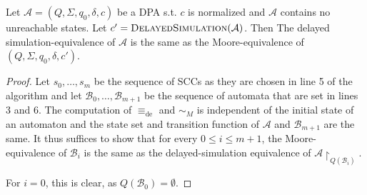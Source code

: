 \begin{theorem}
	Let $\mathcal{A} = (Q, \Sigma, q_0, \delta, c)$ be a DPA s.t. $c$ is normalized and $\mathcal{A}$ contains no unreachable states. Let $c' = \textsc{DelayedSimulation}(\mathcal{A})$. Then The delayed simulation-equivalence of $\mathcal{A}$ is the same as the Moore-equivalence of $(Q, \Sigma, q_0, \delta, c')$.
\end{theorem}

\begin{proof}
	Let $s_0, \dots, s_m$ be the sequence of SCCs as they are chosen in line 5 of the algorithm and let $\mathcal{B}_0, \dots, \mathcal{B}_{m+1}$ be the sequence of automata that are set in lines 3 and 6. The computation of $\equiv_\text{de}$ and $\sim_M$ is independent of the initial state of an automaton and the state set and transition function of $\mathcal{A}$ and $\mathcal{B}_{m+1}$ are the same. It thus suffices to show that for every $0 \leq i \leq m+1$, the Moore-equivalence of $\mathcal{B}_i$ is the same as the delayed-simulation equivalence of $\mathcal{A} \upharpoonright_{Q(\mathcal{B}_i)}$.
	
	For $i = 0$, this is clear, as $Q(\mathcal{B}_0) = \emptyset$.
\end{proof}

























